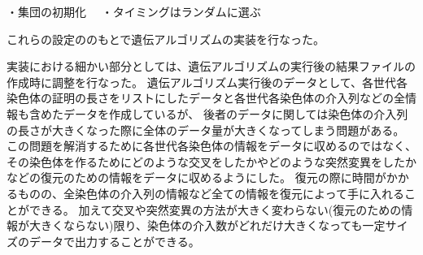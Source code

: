 ・集団の初期化
　・タイミングはランダムに選ぶ

これらの設定ののもとで遺伝アルゴリズムの実装を行なった。


実装における細かい部分としては、遺伝アルゴリズムの実行後の結果ファイルの作成時に調整を行なった。
遺伝アルゴリズム実行後のデータとして、各世代各染色体の証明の長さをリストにしたデータと各世代各染色体の介入列などの全情報も含めたデータを作成しているが、
後者のデータに関しては染色体の介入列の長さが大きくなった際に全体のデータ量が大きくなってしまう問題がある。
この問題を解消するために各世代各染色体の情報をデータに収めるのではなく、その染色体を作るためにどのような交叉をしたかやどのような突然変異をしたかなどの復元のための情報をデータに収めるようにした。
復元の際に時間がかかるものの、全染色体の介入列の情報など全ての情報を復元によって手に入れることができる。
加えて交叉や突然変異の方法が大きく変わらない(復元のための情報が大きくならない)限り、染色体の介入数がどれだけ大きくなっても一定サイズのデータで出力することができる。
